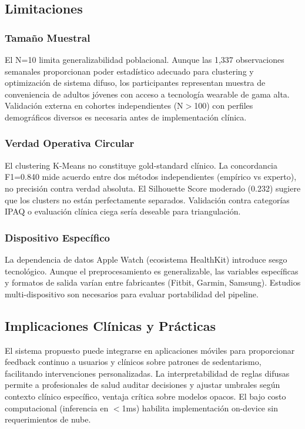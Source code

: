 \documentclass[journal,twoside,web]{ieeecolor}
\begin{document}
\subsection{Limitaciones}

\subsubsection{Tamaño Muestral}
El N=10 limita generalizabilidad poblacional. Aunque las 1,337 observaciones semanales proporcionan poder estadístico adecuado para clustering y optimización de sistema difuso, los participantes representan muestra de conveniencia de adultos jóvenes con acceso a tecnología wearable de gama alta. Validación externa en cohortes independientes (N$>$100) con perfiles demográficos diversos es necesaria antes de implementación clínica.

\subsubsection{Verdad Operativa Circular}
El clustering K-Means no constituye gold-standard clínico. La concordancia F1=0.840 mide acuerdo entre dos métodos independientes (empírico vs experto), no precisión contra verdad absoluta. El Silhouette Score moderado (0.232) sugiere que los clusters no están perfectamente separados. Validación contra categorías IPAQ o evaluación clínica ciega sería deseable para triangulación.

\subsubsection{Dispositivo Específico}
La dependencia de datos Apple Watch (ecosistema HealthKit) introduce sesgo tecnológico. Aunque el preprocesamiento es generalizable, las variables específicas y formatos de salida varían entre fabricantes (Fitbit, Garmin, Samsung). Estudios multi-dispositivo son necesarios para evaluar portabilidad del pipeline.

\subsection{Implicaciones Clínicas y Prácticas}
El sistema propuesto puede integrarse en aplicaciones móviles para proporcionar feedback continuo a usuarios y clínicos sobre patrones de sedentarismo, facilitando intervenciones personalizadas. La interpretabilidad de reglas difusas permite a profesionales de salud auditar decisiones y ajustar umbrales según contexto clínico específico, ventaja crítica sobre modelos opacos. El bajo costo computacional (inferencia en $<$1ms) habilita implementación on-device sin requerimientos de nube.
\end{document}
